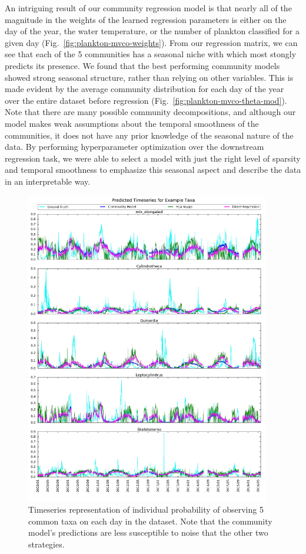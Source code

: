 An intriguing result of our community regression model is that nearly all of the magnitude in the weights of the learned regression parameters is either on the day of the year, the water temperature, or the number of plankton classified for a given day (Fig.~\ref{fig:plankton-mvco-weights}). 
From our regression matrix, we can see that each of the 5 communities has a seasonal niche with which most stongly predicts its presence. We found that the best performing community models showed strong seasonal structure, rather than relying on other variables. This is made evident by the average community distribution for each day of the year over the entire dataset before regression (Fig.~\ref{fig:plankton-mvco-theta-mod}). Note that there are many possible community decompositions, and although our model makes weak assumptions about the temporal smoothness of the communities, it does not have any prior knowledge of the seasonal nature of the data. By performing hyperparameter optimization over the downstream regression task, we were able to select a model with just the right level of sparsity and temporal smoothness to emphasize this seasonal aspect and describe the data in an interpretable way.

\begin{figure}
	\centering
	\includegraphics[width=0.95\textwidth]{figures/oceans/timeseries.jpg}
	\caption{Timeseries representation of individual probability of observing 5 common taxa on each day in the dataset. Note that the community model's predictions are less susceptible to noise that the other two strategies.}
	\label{fig:plankton-mvco-timeseries}
\end{figure}

